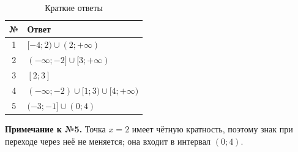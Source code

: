 \documentclass[a4paper,12pt]{article}
\begin{document}
\begin{table}[ht]
\centering
\caption{Краткие ответы}

\begin{tabularx}{\linewidth}{@{}cX@{}}
\toprule
\textbf{№} & \textbf{Ответ} \\
\midrule

1 &
$[-4;2)\cup(2;+\infty)$
\\

2 &
$(-\infty;-2]\cup[3;+\infty)$
\\

3 &
$[2;3]$
\\

4 &
$(-\infty;-2)\cup[1;3)\cup[4;+\infty)$
\\

5 &
$(-3;-1]\cup(0;4)$
\\

\bottomrule
\end{tabularx}
\end{table}

\vspace{0.9cm}

\textbf{Примечание к №5.}
Точка \(x=2\) имеет чётную кратность, поэтому знак при переходе через неё не меняется; она входит в интервал \((0;4)\).
\end{document}
